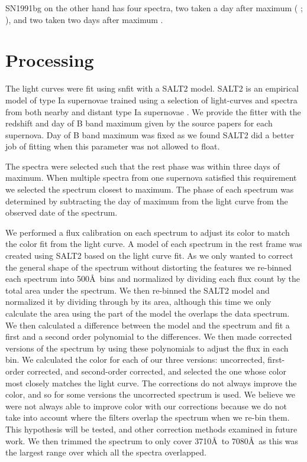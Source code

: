 SN1991bg on the other hand has four spectra, two taken a day after maximum (\citeauthor{gomez96a} \citeyear{gomez96a}; \citeauthor{turatto96b} \citeyear{turatto96b}), and two taken two days after maximum \citep{turatto96b}.

\section{Processing}
The light curves were fit using snfit with a SALT2 model. SALT2 is an empirical model of type Ia supernovae trained using a selection of light-curves and spectra from both nearby and distant type Ia supernovae \citep{guy07a}. We provide the fitter with the redshift and day of B band maximum given by the source papers for each supernova. Day of B band maximum was fixed as we found SALT2 did a better job of fitting when this parameter was not allowed to float.

The spectra were selected such that the rest phase was within three days of maximum. When multiple spectra from one supernova satisfied this requirement we selected the spectrum closest to maximum. The phase of each spectrum was determined by subtracting the day of maximum from the light curve from the observed date of the spectrum.

We performed a flux calibration on each spectrum to adjust its color to match the color fit from the light curve. A model of each spectrum in the rest frame was created using SALT2 based on the light curve fit. As we only wanted to correct the general shape of the spectrum without distorting the features we re-binned each spectrum into 500\AA\ bins and normalized by dividing each flux count by the total area under the spectrum. We then re-binned the SALT2 model and normalized it by dividing through by its area, although this time we only calculate the area using the part of the model the overlaps the data spectrum.  We then calculated a difference between the model and the spectrum and fit a first and a second order polynomial to the differences. We then made corrected versions of the spectrum by using these polynomials to adjust the flux in each bin. We calculated the color for each of our three versions: uncorrected, first-order corrected, and second-order corrected, and selected the one whose color most closely matches the light curve. The corrections do not always improve the color, and so for some versions the uncorrected spectrum is used. We believe we were not always able to improve color with our corrections because we do not take into account where the filters overlap the spectrum when we re-bin them. This hypothesis will be tested, and other correction methods examined in future work. We then trimmed the spectrum to only cover 3710\AA\ to 7080\AA\ as this was the largest range over which all the spectra overlapped.


